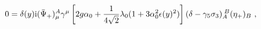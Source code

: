 \begin{equation} \label{rownanienaznikaniebaggerfinall}
    0=\delta(y){\rm i}(\bar{\Psi}_{+})_\mu^A\gamma^\mu\left[2g\alpha_{0}+\frac{1}{4\sqrt{2}}\lambda_0(1+3\alpha^{2}_{0}\epsilon(y)^{2})\right](\delta-\gamma_5\sigma_{3})_{A}^{\;B}(\eta_+)_B\ ,
  \end{equation} 
